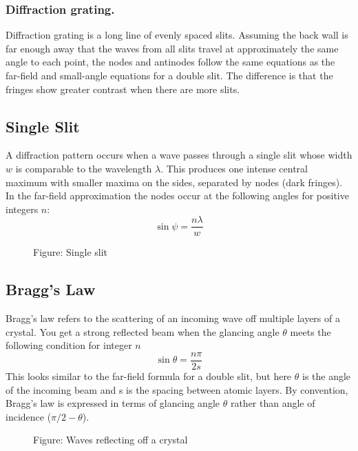 \documentclass[../../main.tex]{subfiles}
\begin{document}
\subsubsection{Diffraction grating.} Diffraction grating is a long line of evenly spaced slits. Assuming the back wall is far enough away that the waves from all slits travel at approximately the same angle to each point, the nodes and antinodes follow the same equations as the far-field and small-angle equations for a double slit. The difference is that the fringes show greater contrast when there are more slits. 

\subsection{Single Slit}
A diffraction pattern occurs when a wave passes through a single slit whose width $w$ is comparable to the wavelength $\lambda$. This produces one intense central maximum with smaller maxima on the sides, separated by nodes (dark fringes). In the far-field approximation the nodes occur at the following angles for positive integers $n$:
\begin{equation*}
    \sin \psi=\frac{n\lambda}{w}
\end{equation*}
\begin{figure}
    \centering
    \caption*{Figure: Single slit}
\end{figure}

\subsection{Bragg's Law}
Bragg's law refers to the scattering of an incoming wave off multiple layers of a crystal. You get a strong reflected beam when the glancing angle $\theta$ meets the following condition for integer $n$
\begin{equation*}
    \sin \theta=\frac{n\pi}{2s}
\end{equation*}
This looks similar to the far-field formula for a double slit, but here $\theta$ is the angle of the incoming beam and s is the spacing between atomic layers. By convention, Bragg's law is expressed in terms of glancing angle $\theta$ rather than angle of incidence ($\pi/2 - \theta$).
\begin{figure}
    \centering
    \caption*{Figure: Waves reflecting off a crystal}
\end{figure}
\end{document}
